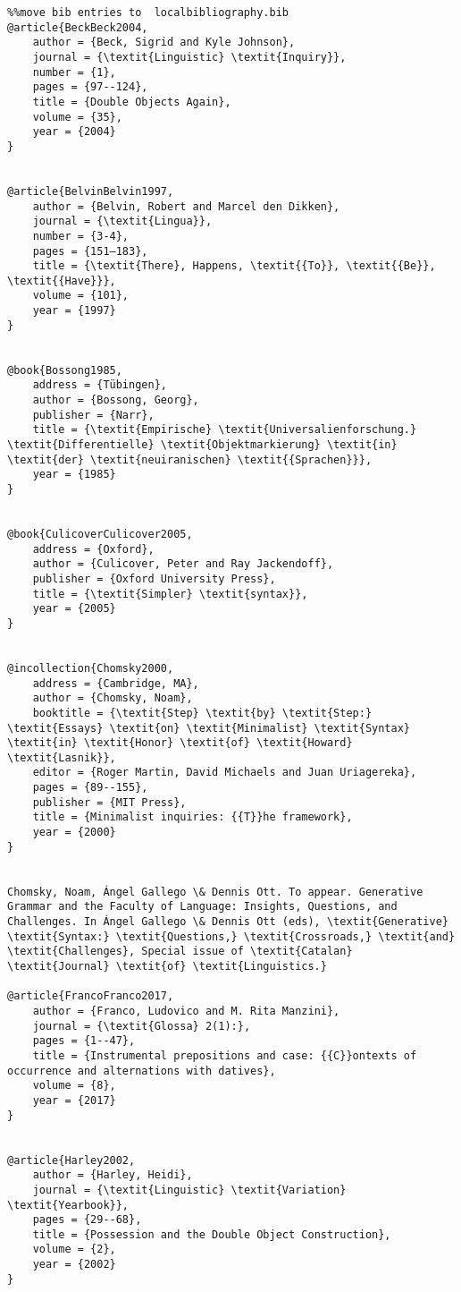 \documentclass[output=paper]{langscibook}
\begin{document}
\begin{verbatim}%%move bib entries to  localbibliography.bib
@article{BeckBeck2004,
	author = {Beck, Sigrid and Kyle Johnson},
	journal = {\textit{Linguistic} \textit{Inquiry}},
	number = {1},
	pages = {97--124},
	title = {Double Objects Again},
	volume = {35},
	year = {2004}
}


@article{BelvinBelvin1997,
	author = {Belvin, Robert and Marcel den Dikken},
	journal = {\textit{Lingua}},
	number = {3-4},
	pages = {151–183},
	title = {\textit{There}, Happens, \textit{{To}}, \textit{{Be}}, \textit{{Have}}},
	volume = {101},
	year = {1997}
}


@book{Bossong1985,
	address = {Tübingen},
	author = {Bossong, Georg},
	publisher = {Narr},
	title = {\textit{Empirische} \textit{Universalienforschung.} \textit{Differentielle} \textit{Objektmarkierung} \textit{in} \textit{der} \textit{neuiranischen} \textit{{Sprachen}}},
	year = {1985}
}


@book{CulicoverCulicover2005,
	address = {Oxford},
	author = {Culicover, Peter and Ray Jackendoff},
	publisher = {Oxford University Press},
	title = {\textit{Simpler} \textit{syntax}},
	year = {2005}
}


@incollection{Chomsky2000,
	address = {Cambridge, MA},
	author = {Chomsky, Noam},
	booktitle = {\textit{Step} \textit{by} \textit{Step:} \textit{Essays} \textit{on} \textit{Minimalist} \textit{Syntax} \textit{in} \textit{Honor} \textit{of} \textit{Howard} \textit{Lasnik}},
	editor = {Roger Martin, David Michaels and Juan Uriagereka},
	pages = {89--155},
	publisher = {MIT Press},
	title = {Minimalist inquiries: {{T}}he framework},
	year = {2000}
}


Chomsky, Noam, Ángel Gallego \& Dennis Ott. To appear. Generative Grammar and the Faculty of Language: Insights, Questions, and Challenges. In Ángel Gallego \& Dennis Ott (eds), \textit{Generative} \textit{Syntax:} \textit{Questions,} \textit{Crossroads,} \textit{and} \textit{Challenges}, Special issue of \textit{Catalan} \textit{Journal} \textit{of} \textit{Linguistics.}

@article{FrancoFranco2017,
	author = {Franco, Ludovico and M. Rita Manzini},
	journal = {\textit{Glossa} 2(1):},
	pages = {1--47},
	title = {Instrumental prepositions and case: {{C}}ontexts of occurrence and alternations with datives},
	volume = {8},
	year = {2017}
}


@article{Harley2002,
	author = {Harley, Heidi},
	journal = {\textit{Linguistic} \textit{Variation} \textit{Yearbook}},
	pages = {29--68},
	title = {Possession and the Double Object Construction},
	volume = {2},
	year = {2002}
}



\end{verbatim}
\end{document}
